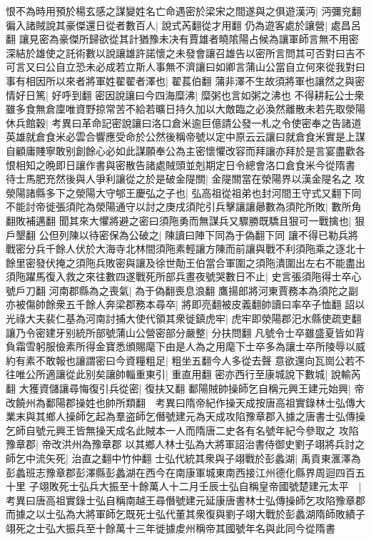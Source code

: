 恨不為時用預於楊玄感之謀變姓名亡命遇密於梁宋之間遂與之俱遊漢沔|{
	沔彌兖翻}
徧入諸賊說其豪傑還日從者數百人|{
	說式芮翻從才用翻}
仍為遊客處於讓營|{
	處昌呂翻}
讓見密為豪傑所歸欲從其計猶豫未决有賈雄者曉隂陽占候為讓軍師言無不用密深結於雄使之託術數以說讓雄許諾懷之未發會讓召雄告以密所言問其可否對曰吉不可言又曰公自立恐未必成若立斯人事無不濟讓曰如卿言蒲山公當自立何來從我對曰事有相因所以來者將軍姓翟翟者澤也|{
	翟萇伯翻}
蒲非澤不生故須將軍也讓然之與密情好日篤|{
	好呼到翻}
密因說讓曰今四海糜沸|{
	糜粥也言如粥之沸也}
不得耕耘公士衆雖多食無倉廩唯資野掠常苦不給若曠日持久加以大敵臨之必渙然離散未若先取滎陽休兵館穀|{
	考異曰革命記密說讓曰洛口倉米逾巨億請公發一札之令使密奉之告諸道英雄就倉食米必雲合響應受命於公然後稱帝號以定中原云云讓曰就倉食米實是上謀自顧庸賤寧敢别創餘心必如此謀願奉公為主密懷懼改容而拜讓亦拜於是言宴盡歡各恨相知之晩即日讓作書與密散告諸處賊頭並剋期定日令總會洛口倉食米今從隋書}
待士馬肥充然後與人爭利讓從之於是破金隄關|{
	金隄關當在滎陽界以漢金隄名之}
攻滎陽諸縣多下之滎陽大守郇王慶弘之子也|{
	弘高祖從祖弟也封河間王守式又翻下同}
不能討帝徙張須陀為滎陽通守以討之庚戌須陀引兵擊讓讓曏數為須陀所敗|{
	數所角翻敗補邁翻}
聞其來大懼將避之密曰須陁勇而無謀兵又驟勝既驕且狠可一戰擒也|{
	狠戶墾翻}
公但列陳以待密保為公破之|{
	陳讀曰陣下同為于偽翻下同}
讓不得已勒兵將戰密分兵千餘人伏於大海寺北林間須陁素輕讓方陳而前讓與戰不利須陁乘之逐北十餘里密發伏掩之須陁兵敗密與讓及徐世勣王伯當合軍圍之須陁潰圍出左右不能盡出須陁躍馬復入救之來往數四遂戰死所部兵晝夜號哭數日不止|{
	史言張須陁得士卒心號戶刀翻}
河南郡縣為之喪氣|{
	為于偽翻喪息浪翻}
鷹揚郎將河東賈務本為須陀之副亦被傷帥餘衆五千餘人奔梁郡務本尋卒|{
	將即亮翻被皮義翻帥讀曰率卒子恤翻}
詔以光祿大夫裴仁基為河南討捕大使代領其衆徙鎮虎牢|{
	虎牢即滎陽郡汜水縣使疏吏翻}
讓乃令密建牙别統所部號蒲山公營密部分嚴整|{
	分扶問翻}
凡號令士卒雖盛夏皆如背負霜雪躬服儉素所得金寶悉頒賜麾下由是人為之用麾下士卒多為讓士卒所陵辱以威約有素不敢報也讓謂密曰今資糧粗足|{
	粗坐五翻今人多從去聲}
意欲還向瓦崗公若不往唯公所適讓從此别矣讓帥輜重東引|{
	重直用翻}
密亦西行至康城說下數城|{
	說輸芮翻}
大獲資儲讓尋悔復引兵從密|{
	復扶又翻}
鄱陽賊帥操師乞自稱元興王建元始興|{
	帝改饒州為鄱陽郡操姓也帥所類翻　考異曰隋帝紀作操天成按唐高祖實錄林士弘傳大業末與其鄉人操師乞起為羣盗師乞僭號建元為天成攻陷豫章郡入據之唐書士弘傳操乞師自號元興王皆無操天成名此賊本一人而隋唐二史各有名號年紀今參取之}
攻陷豫章郡|{
	帝改洪州為豫章郡}
以其鄉人林士弘為大將軍詔治書侍御史劉子翊將兵討之師乞中流矢死|{
	治直之翻中竹仲翻}
士弘代統其衆與子翊戰於彭蠡湖|{
	禹貢東滙澤為彭蠡班志豫章郡彭澤縣彭蠡湖在西今在南康軍城東南西接江州德化縣界周迴四百五十里}
子翊敗死士弘兵大振至十餘萬人十二月壬辰士弘自稱皇帝國號楚建元太平　|{
	考異曰唐高祖實錄士弘自稱南越王尋僭號建元延康唐書林士弘傳操師乞攻陷豫章郡而據之以士弘為大將軍師乞既死士弘代董其衆復與劉子翊大戰於彭蠡湖隋師敗績子翊死之士弘大振兵至十餘萬十三年徙據䖍州稱帝其國號年名與此同今從隋書}
